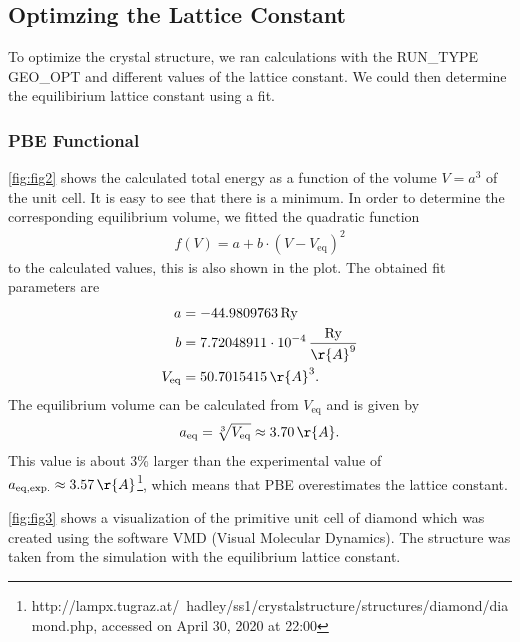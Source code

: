 \documentclass[a4paper,10pt,bibtotoc]{scrartcl}
\begin{document}
\subsection{Optimzing the Lattice Constant}
To optimize the crystal structure, we ran calculations with the RUN\_TYPE GEO\_OPT and different values of the lattice constant. We could then determine the equilibirium lattice constant using a fit.

\subsubsection{PBE Functional}
\autoref{fig:fig2} shows the calculated total energy as a function of the volume $V=a^3$ of the unit cell. It is easy to see that there is a minimum. In order to determine the corresponding equilibrium volume, we fitted the quadratic function
\begin{align}
f(V) = a + b\cdot\left(V-V_\mathrm{eq}\right)^2
\end{align}
to the calculated values, this is also shown in the plot. The obtained fit parameters are
\begin{align}
a &= -44.9809763\,\mathrm{Ry}\\
b &= 7.72048911\cdot 10^{-4}\,\frac{\mathrm{Ry}}{\r{A}^9}\\
V_\mathrm{eq} &= 50.7015415\,\r{A}^3.
\end{align}
The equilibrium volume can be calculated from $V_\mathrm{eq}$ and is given by
\begin{align}
a_\mathrm{eq} = \sqrt[3]{V_\mathrm{eq}} \approx 3.70\,\r{A}.
\end{align}
This value is about 3\% larger than the experimental value of $a_\mathrm{eq,exp.} \approx 3.57\,\r{A}$\footnote{http://lampx.tugraz.at/~hadley/ss1/crystalstructure/structures/diamond/diamond.php, accessed on April 30, 2020 at 22:00}, which means that PBE overestimates the lattice constant.

\autoref{fig:fig3} shows a visualization of the primitive unit cell of diamond which was created using the software VMD (Visual Molecular Dynamics). The structure was taken from the simulation with the equilibrium lattice constant.
\end{document}
